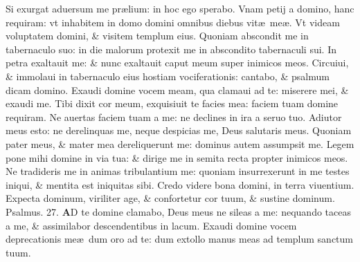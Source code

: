\documentclass[a5paper,10pt]{book}
\def\ae{æ}
\begin{document}
\begin{multicols*}{2}
\newline \color{red} S\color{black}i exurgat aduersum me pr\ae lium: in hoc ego sperabo.
\newline \color{red} V\color{black}nam petij a domino, hanc requiram: vt inhabitem in domo domini omnibus diebus vit\ae \ me\ae .
\newline \color{red} V\color{black}t videam voluptatem domini, \& visitem templum eius.
\newline \color{red} Q\color{black}uoniam abscondit me in tabernaculo suo: in die malorum protexit me in abscondito tabernaculi sui.
\newline \color{red} I\color{black}n petra exaltauit me: \& nunc exaltauit caput meum super inimicos meos.
\newline \color{red} C\color{black}ircuiui, \& immolaui in tabernaculo eius hostiam vociferationis: cantabo, \& psalmum dicam domino.
\newline \color{red} E\color{black}xaudi domine vocem meam, qua clamaui ad te: miserere mei, \& exaudi me.
\newline \color{red} T\color{black}ibi dixit cor meum, exquisiuit te facies mea: faciem tuam domine requiram.
\newline \color{red} N\color{black}e auertas faciem tuam a me: ne declines in ira a seruo tuo.
\newline \color{red} A\color{black}diutor meus esto: ne derelinquas me, neque despicias me, Deus salutaris meus.
\newline \color{red} Q\color{black}uoniam pater meus, \& mater mea dereliquerunt me: dominus autem assumpsit me.
\newline \color{red} L\color{black}egem pone mihi domine in via tua: \& dirige me in semita recta propter inimicos meos.%
\newline \color{red} N\color{black}e tradideris me in animas tribulantium me: quoniam insurrexerunt in me testes iniqui, \& mentita est iniquitas sibi.
\newline \color{red} C\color{black}redo videre bona domini, in terra viuentium.
\newline \color{red} E\color{black}xpecta dominum, viriliter age, \& confortetur cor tuum, \& sustine dominum. \quad \color{red} Psalmus. \hypertarget{ps27}{27.} \color{black}
\vspace{-1em}
\lettrine[lines=2]{\bfseries \color{red} A}{}D te domine clamabo, Deus meus ne sileas a me: nequando taceas a me, \& assimilabor descendentibus in lacum.
\newline \color{red} E\color{black}xaudi domine vocem deprecationis me\ae \ dum oro ad te: dum extollo manus meas ad templum sanctum tuum.

\end{multicols*}
\end{document}
